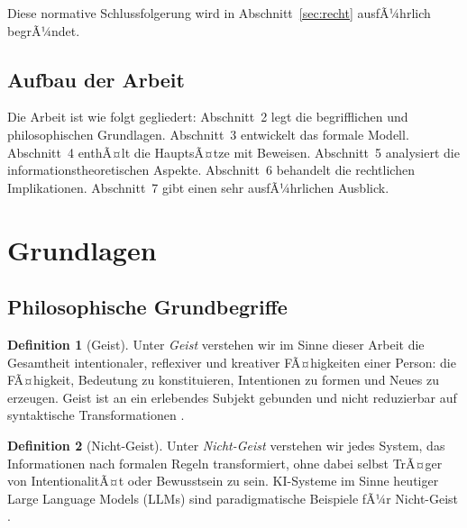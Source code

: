 ﻿\documentclass[a4paper,12pt]{article}
\theoremstyle{definition}
\newtheorem{definition}{Definition}
\begin{document}
\noindent Diese normative Schlussfolgerung wird in Abschnitt~\ref{sec:recht} ausfÃ¼hrlich
begrÃ¼ndet.

\subsection{Aufbau der Arbeit}

Die Arbeit ist wie folgt gegliedert: Abschnitt~2 legt die begrifflichen und philosophischen
Grundlagen. Abschnitt~3 entwickelt das formale Modell. Abschnitt~4 enthÃ¤lt die HauptsÃ¤tze mit
Beweisen. Abschnitt~5 analysiert die informationstheoretischen Aspekte. Abschnitt~6 behandelt
die rechtlichen Implikationen. Abschnitt~7 gibt einen sehr ausfÃ¼hrlichen Ausblick.

\section{Grundlagen}

\subsection{Philosophische Grundbegriffe}

\begin{definition}[Geist]
\label{def:geist}
Unter \emph{Geist} verstehen wir im Sinne dieser Arbeit die Gesamtheit intentionaler,
reflexiver und kreativer FÃ¤higkeiten einer Person: die FÃ¤higkeit, Bedeutung zu konstituieren,
Intentionen zu formen und Neues zu erzeugen. Geist ist an ein erlebendes Subjekt gebunden
und nicht reduzierbar auf syntaktische Transformationen \cite{searle1980minds}.
\end{definition}

\begin{definition}[Nicht-Geist]
\label{def:nichtgeist}
Unter \emph{Nicht-Geist} verstehen wir jedes System, das Informationen nach formalen Regeln
transformiert, ohne dabei selbst TrÃ¤ger von IntentionalitÃ¤t oder Bewusstsein zu sein. KI-Systeme
im Sinne heutiger Large Language Models (LLMs) sind paradigmatische Beispiele fÃ¼r
Nicht-Geist \cite{turing1950computing}.
\end{definition}
\end{document}
